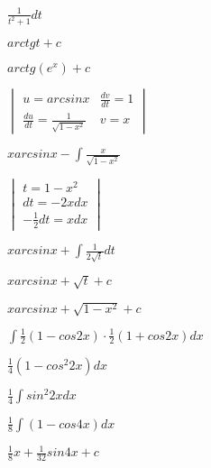\documentclass{article}
\begin{document}
$
\frac{1}{t^2 + 1}dt
$

$
arctgt + c
$

$
arctg(e^x) + c
$

$
\begin{vmatrix} u = arcsinx & \frac{dv}{dt} = 1 \\  \frac{du}{dt} = \frac{1}{\sqrt{1 - x^2}} & v = x \end{vmatrix}
$

$
xarcsinx - \int \frac{x}{\sqrt{1-x^2}}
$

$
\begin{vmatrix} t = 1 - x^2 \\ dt = -2xdx \\ -\frac{1}{2}dt = xdx \end{vmatrix}
$

$
xarcsinx + \int \frac{1}{2\sqrt{t}}dt
$

$
xarcsinx + \sqrt{t} + c
$

$
xarcsinx + \sqrt{1-x^2} + c
$

$
\int \frac{1}{2}(1-cos2x)\cdot\frac{1}{2}(1+cos2x)dx
$

$
\frac{1}{4}(1 - cos^2 2x)dx
$

$
\frac{1}{4} \int sin^2 2xdx 
$

$
\frac{1}{8} \int (1 - cos4x)dx 
$

$
\frac{1}{8}x + \frac{1}{32}sin4x + c
$
\end{document}
